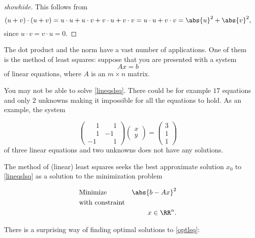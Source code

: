 \documentclass{article}
\begin{document}
  \begin{proof}[showhide]
    This follows from
    $$
    (u + v)\cdot(u+v) = u\cdot u + u\cdot v + v\cdot u + v\cdot v = u\cdot u + v\cdot v = \abs{u}^2 + \abs{v}^2,
    $$
    since $u \cdot v = v\cdot u = 0$.
  \end{proof}




The dot product and the norm have a vast number of applications. One of them is the
method of least squares: suppose that you are presented with a system
\begin{equation}\label{lineqslsq}
A x = b
\end{equation}
of linear equations, where $A$ is an $m\times n$ matrix.

You may not be able to solve \eqref{lineqslsq}. There could be for example
$17$ equations and only $2$ unknowns making it impossible for all the equations to hold.
As an example, the system

\newcommand{\mph}{\phantom{-}}

\begin{equation}\label{nosols}
\begin{pmatrix}
\mph 1 & \mph 1\\
\mph 1 & -1\\
-1 & \mph 1
\end{pmatrix} \begin{pmatrix} x \\ y\end{pmatrix} = \begin{pmatrix} 3 \\ 1 \\ 1 \end{pmatrix}
\end{equation}
of three linear equations and two unknowns does not have any solutions.


The method of (linear) least squares seeks the best approximate solution $x_0$ to \eqref{lineqslsq} as a
solution to the minimization problem



\begin{align}\label{optlsq}
  &\text{Minimize} &\abs{b - A x}^2&\\
  &\text{with constraint}\\
  &&x\in\RR^n.
\end{align}

There is a surprising way of finding optimal solutions to \eqref{optlsq}:
\end{document}
